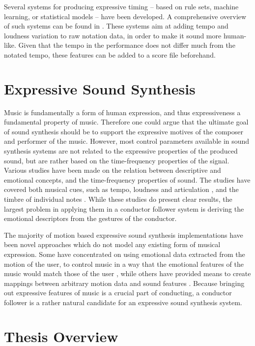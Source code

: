 Several systems for producing expressive timing --
based on rule sets, machine learning, or statistical models --
have been developed.
A comprehensive overview of such systems can be found in \cite{Kirke2012}.
These systems aim at adding tempo and loudness variation
to raw notation data,
in order to make it sound more human-like.
Given that the tempo in the performance does not differ much
from the notated tempo,
these features can be added to a score file beforehand.


\section{Expressive Sound Synthesis}

Music is fundamentally a form of human expression,
and thus expressiveness a fundamental property of music.
Therefore one could argue that the ultimate goal of sound synthesis should be to support
the expressive motives of the composer and performer of the music.
However, most control parameters available in sound synthesis systems
are not related to the expressive properties of the produced sound,
but are rather based on the time-frequency properties of the signal.
Various studies have been made on the relation between
descriptive and emotional concepts,
and the time-frequency properties of sound.
The studies have covered both musical cues,
such as tempo, loudness and articulation \cite{juslin2000cue},
and the timbre of individual notes \cite{moravec2005}.
While these studies do present clear results,
the largest problem in applying them in a conductor follower system
is deriving the emotional descriptors from the
gestures of the conductor. 

The majority of motion based expressive sound synthesis implementations
have been novel approaches which do not model any existing form of musical expression.
Some have concentrated on using emotional data
extracted from the motion of the user,
to control music in a way that the
emotional features of the music would match those of the user \cite{friberg2004},
while others have provided means to create mappings
between arbitrary motion data and sound features \cite{kia2004}.
Because bringing out expressive features of music is a crucial part of conducting,
a conductor follower is a rather natural candidate for
an expressive sound synthesis system.

\section{Thesis Overview}

